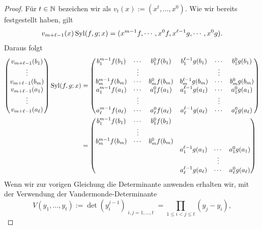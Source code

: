 \documentclass[11pt]{article}
\numberwithin{equation}{section}
\begin{document}
\begin{proof}
		Für $t \in \mathbb{N}$ bezeichen wir als $v_t(x) := (x^t,\ldots, x^0)$.  Wie wir bereits festgestellt haben, gilt 
		\[
			v_{m+\ell-1} (x) \operatorname{Syl}(f,g;x) = ( x^{m-1} f,\cdots, x^0 f, x^{\ell-1} g, \cdots, x^0 g). 
		\]
		Daraus folgt { \scriptsize 
		\begin{align*}
				\begin{pmatrix} 
						v_{m+\ell-1} (b_1)
						\\ \vdots
						\\ v_{m+\ell-1} (b_m) 
						\\ v_{m+\ell-1} (a_1)
						\\ \vdots 
						\\ v_{m+\ell-1} (a_\ell)
				\end{pmatrix} 
				\syl(f,g;x) 
				& =
				\begin{pmatrix*}
						b_1^{m-1} f(b_1) & \cdots & b_1^0 f(b_1) & b_1^{\ell-1} g(b_1) & \cdots & b_1^0 g(b_1)
						\\  & \vdots & & & \vdots & 
						\\ 
						b_m^{m-1} f(b_m) & \cdots & b_m^0 f(b_m) & b_m^{\ell-1} g(b_m) & \cdots & b_m^0 g(b_m)
						\\ 						a_1^{m-1} f(a_1) & \cdots & a_1^0 f(a_1) & a_1^{\ell-1} g(a_1) & \cdots & a_1^0 g(a_1)
						\\  & \vdots & & & \vdots & 						
					\\ 		a_\ell^{m-1} f(a_\ell) & \cdots & a_\ell^0 f(a_\ell) & a_\ell^{\ell-1} g(a_\ell) & \cdots & a_\ell^0 g(a_\ell)
				\end{pmatrix*}
			\\ 
			& =
			\begin{pmatrix*}
				b_1^{m-1} f(b_1) & \cdots & b_1^0 f(b_1) &  &  & 
				\\  & \vdots & & &  & 
				\\ 
				b_m^{m-1} f(b_m) & \cdots & b_m^0 f(b_m) &  & & 
				\\ 	 &  &  & a_1^{\ell-1} g(a_1) & \cdots & a_1^0 g(a_1)
				\\  &  & & & \vdots & 						
				\\ 		 &  & & a_\ell^{\ell-1} g(a_\ell) & \cdots & a_\ell^0 g(a_\ell)
			\end{pmatrix*}
		\end{align*}
		}
		Wenn wir zur vorigen Gleichung die Determinante anwenden erhalten wir, mit der Verwendung der Vandermonde-Determinante 
		{\scriptsize 
		\[
			V( y_1,\ldots,y_t ) := \det (y_i^{j-1} )_{\substack{i,j=1,\ldots,t} } = \prod_{1 \le i < j \le t} (y_j -y_i),
\]}
\end{proof}
\end{document}

